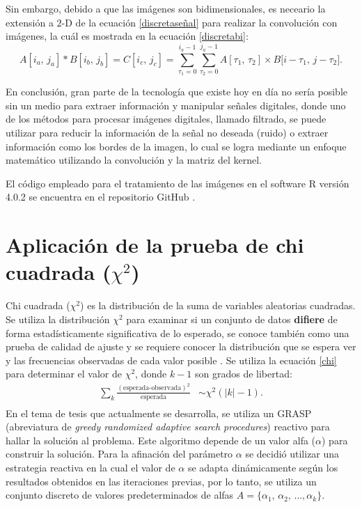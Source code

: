 \documentclass{article}
\begin{document}
Sin embargo, debido a que las imágenes son bidimensionales, es neceario la extensión a $2$-D de la ecuación \ref{discretaseñal} para realizar la convolución con imágenes, la cuál es mostrada en la ecuación \ref{discretabi}:
\begin{equation} 
A{[i_{a}, \, j_{a}]} * B{[i_{b}, \, j_{b}]} = C{[i_{c}, \, j_{c}]} = \sum_{\tau_{1}=0}^{i_{a}-1} \sum_{\tau_{2}=0}^{j_{a}-1} A[\tau_{1}, \, \tau_{2}] \times B{[i-\tau_{1}, \, j-\tau_{2}}]. 
\label{discretabi}
\end{equation}

En conclusión, gran parte de la tecnología que existe hoy en día no sería posible sin un medio para extraer información y manipular señales digitales, donde uno de los métodos para procesar imágenes digitales, llamado filtrado, se puede utilizar para reducir la información de la señal no deseada (ruido) o extraer información como los bordes de la imagen, lo cual se logra mediante un enfoque matemático utilizando la convolución y la matriz del kernel.  

El código empleado para el tratamiento de las imágenes en el software R versión 4.0.2 \cite{r} se encuentra en el repositorio GitHub \cite{github}.

\section{Aplicación de la prueba de chi cuadrada ($\chi^{2}$)}

Chi cuadrada ($\chi^2$) es la distribución de la suma de variables aleatorias cuadradas. Se utiliza la distribución $\chi^2$ para examinar si un conjunto de datos \textbf{difiere} de forma estadísticamente significativa de lo esperado, se conoce también como una prueba de calidad de ajuste y se requiere conocer la distribución que se espera ver y las frecuencias observadas de cada valor posible \cite{notasElisa}. Se utiliza la ecuación \ref{chi} para determinar el valor de $\chi^{2}$, donde $k-1$ son grados de libertad:
\begin{align} 
  \sum_{k} \frac{(\text{esperada-observada})^2}{\text{esperada}} & \sim \chi^2(|k|-1). \label{chi} \\  \nonumber
\end{align}
En el tema de tesis que actualmente se desarrolla, se utiliza un GRASP (abreviatura de \textit{greedy randomized adaptive search procedures}) reactivo para hallar la solución al  problema. Este algoritmo depende de un valor alfa ($\alpha$) para construir la solución. Para la afinación del parámetro $\alpha$ se decidió utilizar una estrategia reactiva en la cual el valor de $\alpha$ se adapta dinámicamente según los resultados obtenidos en las iteraciones previas, por lo tanto, se utiliza un conjunto discreto de valores predeterminados de alfas $A = \{\alpha_{1},\, \alpha_{2}, \, \dots, \alpha_{k}\}$.
\end{document}

